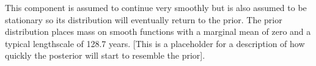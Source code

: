 This component is assumed to continue very smoothly but is also assumed to be stationary so its distribution will eventually return to the prior.
The prior distribution places mass on smooth functions with a marginal mean of zero and a typical lengthscale of 128.7 years.
[This is a placeholder for a description of how quickly the posterior will start to resemble the prior].